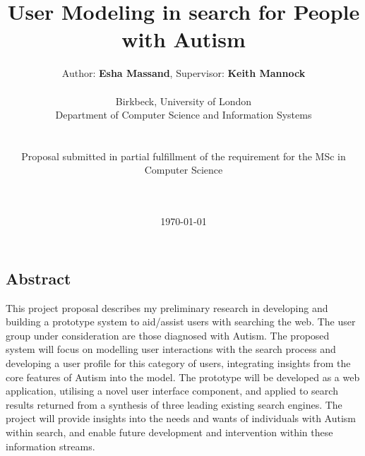 \documentclass[a4paper, 10pt]{article}
\begin{document}
\LARGE\title{User Modeling in search for People with Autism}

\LARGE\author{Author: \textbf{Esha Massand}, Supervisor: \textbf{Keith Mannock}\\
\\
Birkbeck, University of London\\Department of Computer Science and Information Systems\\\\\\Proposal submitted in partial fulfillment of the requirement for the MSc in Computer Science\date{\mydate\today}
\\\
}

\normalsize


\maketitle

\begin{center}

\section*{Abstract}
This project proposal describes my preliminary research in developing and building a prototype system to aid/assist users with searching the web. The user group under consideration are those diagnosed with Autism. The proposed system will focus on modelling user interactions with the search process and developing a user profile for this category of users, integrating insights from the core features of Autism into the model. The prototype will be developed as a web application, utilising a novel user interface component, and applied to search results returned from a synthesis of three leading existing search engines. The project will provide insights into the needs and wants of individuals with Autism within search, and enable future development and intervention within these information streams.\\

\end{center}

\begin{verbatim}





















\end{verbatim}
\end{document}
